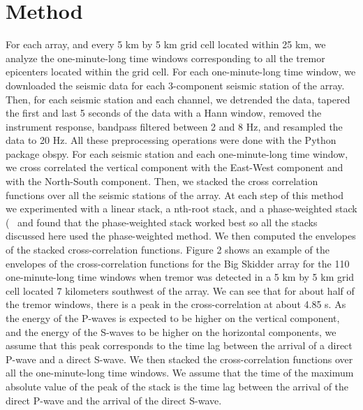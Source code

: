 \documentclass[draft]{agujournal2019}
\begin{document}
\section{Method}

For each array, and every 5 km by 5 km grid cell located within 25 km, we analyze the one-minute-long time windows corresponding to all the tremor epicenters located within the grid cell. For each one-minute-long time window, we downloaded the seismic data for each 3-component seismic station of the array. Then, for each seismic station and each channel, we detrended the data, tapered the first and last 5 seconds of the data with a Hann window, removed the instrument response, bandpass filtered between 2 and 8 Hz, and resampled the data to 20 Hz. All these preprocessing operations were done with the Python package obspy. For each seismic station and each one-minute-long time window, we cross correlated the vertical component with the East-West component and with the North-South component. Then, we stacked the cross correlation functions over all the seismic stations of the array. At each step of this method we experimented with a linear stack, a nth-root stack, and a phase-weighted stack (~\cite{SCH_1997} and found that the phase-weighted stack worked best so all the stacks discussed here used the phase-weighted method. We then computed the envelopes of the stacked cross-correlation functions. Figure 2 shows an example of the envelopes of the cross-correlation functions for the Big Skidder array for the 110 one-minute-long time windows when tremor was detected in a 5 km by 5 km grid cell located 7 kilometers southwest of the array. We can see that for about half of the tremor windows, there is a peak in the cross-correlation at about 4.85 s. As the energy of the P-waves is expected to be higher on the vertical component, and the energy of the S-waves to be higher on the horizontal components, we assume that this peak corresponds to the time lag between the arrival of a direct P-wave and a direct S-wave. We then stacked the cross-correlation functions over all the one-minute-long time windows. We assume that the time of the maximum absolute value of the peak of the stack is the time lag between the arrival of the direct P-wave and the arrival of the direct S-wave.
\end{document}
